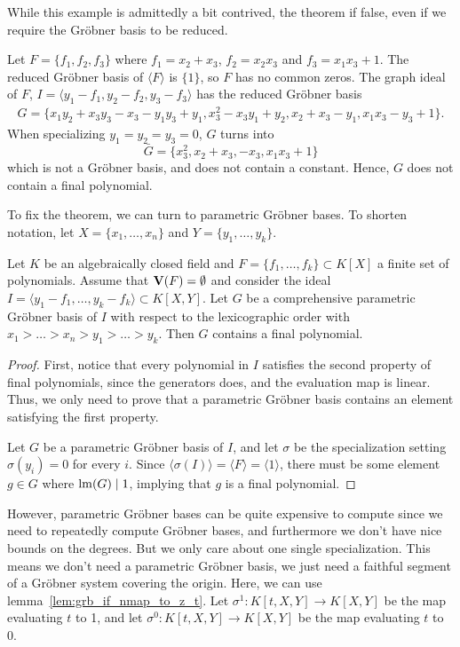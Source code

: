 While this example is admittedly a bit contrived, the theorem if false, even if we require the Gröbner basis to be reduced.

\begin{example}\upshape
    Let $F = \{f_1, f_2, f_3\}$ where $f_1 = x_2 + x_3$, $f_2 = x_2 x_3$ and $f_3 = x_1 x_3 + 1$. The reduced Gröbner basis of $\langle F \rangle$ is $\{1\}$, so $F$ has no common zeros. The graph ideal of $F$, $I = \langle y_1 - f_1, y_2 - f_2, y_3 - f_3 \rangle$ has the reduced Gröbner basis
    \begin{gather*}
    G = \{ x_1 y_2 + x_3 y_3 - x_3 - y_1 y_3 + y_1, x_3^2 - x_3 y_1 + y_2, x_2 + x_3 - y_1, x_1 x_3 - y_3 + 1\}.
    \end{gather*}
    When specializing $y_1 = y_2 = y_3 = 0$, $G$ turns into
    \[\bar G = \{ x_3^2, x_2 + x_3, -x_3, x_1 x_3 + 1\}\]
    which is not a Gröbner basis, and does not contain a constant. Hence, $G$ does not contain a final polynomial.
\end{example}


To fix the theorem, we can turn to parametric Gröbner bases. To shorten notation, let $X = \{x_{1}, \dots, x_{n}\}$ and $Y = \{y_{1}, \dots, y_{k}\}$.

\begin{theorem}
  Let $K$ be an algebraically closed field and $F = \{f_{1}, \dots, f_{k}\} \subset K[X]$ a finite set of polynomials. Assume that $\operatorname{\mathbf V}(F) = \emptyset$ and consider the ideal $I = \langle y_{1} - f_{1}, \dots, y_{k} - f_{k} \rangle \subset K[X, Y]$. Let $G$ be a comprehensive parametric Gröbner basis of $I$ with respect to the lexicographic order with $x_{1} > \dots > x_{n} > y_{1} > \dots > y_{k}$. Then $G$ contains a final polynomial.
\end{theorem}
\begin{proof}
  First, notice that every polynomial in $I$ satisfies the second property of final polynomials, since the generators does, and the evaluation map is linear. Thus, we only need to prove that a parametric Gröbner basis contains an element satisfying the first property.

  Let $G$ be a parametric Gröbner basis of $I$, and let $\sigma$ be the specialization setting $\sigma(y_{i}) = 0$ for every $i$. Since $\langle \sigma(I) \rangle = \langle F \rangle = \langle 1 \rangle$, there must be some element $g \in G$ where $\operatorname{lm}(G) \mid 1$, implying that $g$ is a final polynomial.
\end{proof}

However, parametric Gröbner bases can be quite expensive to compute since we need to repeatedly compute Gröbner bases, and furthermore we don't have nice bounds on the degrees. But we only care about one single specialization. This means we don't need a parametric Gröbner basis, we just need a faithful segment of a Gröbner system covering the origin. Here, we can use lemma~\ref{lem:grb_if_nmap_to_z_t}. Let $\sigma^{1} : K[t, X, Y] \to K[X, Y]$ be the map evaluating $t$ to 1, and let $\sigma^{0} : K[t, X, Y] \to K[X, Y]$ be the map evaluating $t$ to 0.


